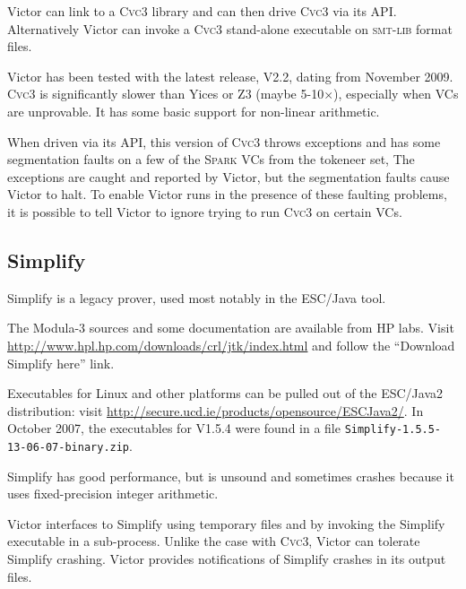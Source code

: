 \documentclass[12pt,fleqn]{article}
\newcommand{\spark}{\textsc{Spark}}
\newcommand{\cvcthree}{\textsc{Cvc}3}
\newcommand{\zthree}{\textsc{Z}3}
\newcommand{\yices}{Yices}
\newcommand{\smtlib}{\textsc{smt-lib}}
\begin{document}
Victor can link to a \cvcthree{} library and can then drive
\cvcthree{} via its API.  Alternatively Victor can invoke a
\cvcthree{} stand-alone executable on \smtlib{} format files.

Victor has been tested with the latest release, V2.2, dating from
November 2009.  
%
%
\cvcthree{} is significantly slower than \yices{} or \zthree{} (maybe
5-10$\times$), especially when VCs are unprovable. 
%
It has some basic support for non-linear arithmetic.

When driven via its API, this version of \cvcthree{} throws exceptions
and has some segmentation faults on a few of the \spark{} VCs from the
tokeneer set,
%
The exceptions are caught and reported by Victor, but 
%
the segmentation faults cause Victor to halt.  To enable Victor runs
in the presence of these faulting problems, it is possible to tell
Victor to ignore trying to run \cvcthree{} on certain VCs.  


\subsection{Simplify}

Simplify is a legacy prover, used most notably in the ESC/Java tool. 

The Modula-3 sources and some documentation are available from HP labs.
Visit \url{http://www.hpl.hp.com/downloads/crl/jtk/index.html} and follow
the ``Download Simplify here'' link.

Executables for Linux and other platforms can be pulled out of the
ESC/Java2 distribution: visit
\url{http://secure.ucd.ie/products/opensource/ESCJava2/}.
In October 2007, the executables for V1.5.4 were found in a file 
\texttt{Simplify-1.5.5-13-06-07-binary.zip}.

Simplify has good performance, but is unsound and sometimes crashes
because it uses fixed-precision integer arithmetic.

Victor interfaces to Simplify using temporary files and by invoking
the Simplify executable in a sub-process.  Unlike the case with
\cvcthree{}, Victor can tolerate Simplify crashing.  Victor provides
notifications of Simplify crashes in its output files.


\end{document}
